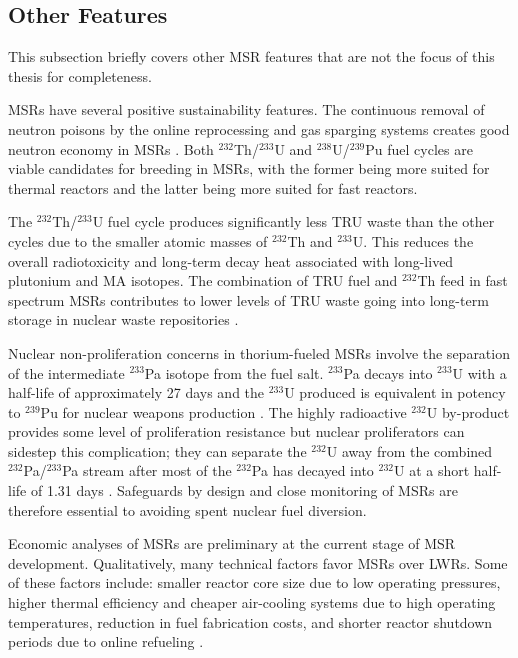 \subsection{Other Features}

This subsection briefly covers other \gls{MSR} features that are not the focus
of this thesis for completeness.

\glspl{MSR} have several positive sustainability features.
The continuous removal of neutron poisons by the online reprocessing and gas
sparging systems creates good neutron economy in \glspl{MSR}
\cite{kamei_recent_2012}. Both
$^{232}$Th/$^{233}$U and $^{238}$U/$^{239}$Pu fuel cycles are viable
candidates for breeding in \glspl{MSR}, with the former being more suited for
thermal reactors and the latter being more suited for fast reactors.

The $^{232}$Th/$^{233}$U fuel cycle produces significantly less \gls{TRU}
waste than the other cycles due to the smaller atomic masses of $^{232}$Th and
$^{233}$U. This reduces the overall radiotoxicity and long-term decay heat
associated with long-lived plutonium and \gls{MA} isotopes. The combination
of \gls{TRU} fuel and $^{232}$Th feed in fast spectrum \glspl{MSR} contributes
to lower levels of \gls{TRU} waste going into long-term storage in
nuclear waste repositories \cite{merle-lucotte_launching_2011}.

Nuclear non-proliferation concerns in thorium-fueled \glspl{MSR} involve the
separation of the intermediate $^{233}$Pa
isotope from the fuel salt. $^{233}$Pa decays into $^{233}$U with a half-life
of approximately 27 days and the $^{233}$U produced is equivalent in potency
to $^{239}$Pu for nuclear weapons production \cite{grape_10_2017}. The highly
radioactive $^{232}$U
by-product provides some level of proliferation resistance but nuclear
proliferators can sidestep this complication; they can
separate the $^{232}$U away from the combined $^{232}$Pa/$^{233}$Pa stream
after most of the $^{232}$Pa has decayed into $^{232}$U at a short half-life
of 1.31 days \cite{grape_10_2017}. Safeguards by design and close monitoring
of \glspl{MSR} are therefore essential to avoiding spent nuclear fuel
diversion.

Economic analyses of \glspl{MSR} are preliminary at the current
stage of \gls{MSR} development. Qualitatively, many technical factors favor
\glspl{MSR} over \glspl{LWR}. Some of these factors include: smaller reactor
core size due to low operating pressures, higher thermal efficiency and
cheaper air-cooling systems due to high operating temperatures, reduction in
fuel fabrication costs, and shorter reactor shutdown periods due to online
refueling \cite{dolan_1_2017}. 

